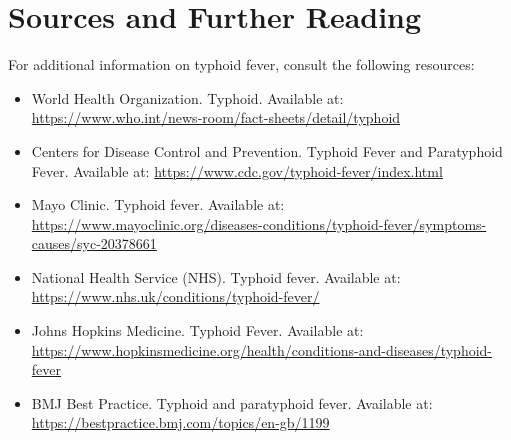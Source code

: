 \section*{Sources and Further Reading}
For additional information on typhoid fever, consult the following resources:
\begin{itemize}
  \item World Health Organization. Typhoid. Available at: \url{https://www.who.int/news-room/fact-sheets/detail/typhoid}
  \item Centers for Disease Control and Prevention. Typhoid Fever and Paratyphoid Fever. Available at: \url{https://www.cdc.gov/typhoid-fever/index.html}
  \item Mayo Clinic. Typhoid fever. Available at: \url{https://www.mayoclinic.org/diseases-conditions/typhoid-fever/symptoms-causes/syc-20378661}
  \item National Health Service (NHS). Typhoid fever. Available at: \url{https://www.nhs.uk/conditions/typhoid-fever/}
  \item Johns Hopkins Medicine. Typhoid Fever. Available at: \url{https://www.hopkinsmedicine.org/health/conditions-and-diseases/typhoid-fever}
  \item BMJ Best Practice. Typhoid and paratyphoid fever. Available at: \url{https://bestpractice.bmj.com/topics/en-gb/1199}
\end{itemize}